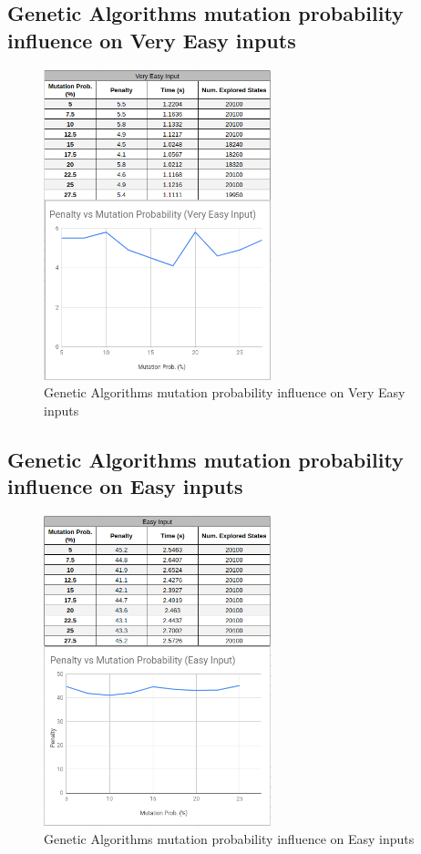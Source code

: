 \documentclass[conference]{IEEEtran}
\begin{document}
\subsection{Genetic Algorithms mutation probability influence on Very Easy inputs}

\begin{figure}[H]
    \centerline{\includegraphics[width=250px]{mutation_prob_very_easy.png}}
    \caption{Genetic Algorithms mutation probability influence on Very Easy inputs}
\end{figure}

\subsection{Genetic Algorithms mutation probability influence on Easy inputs}

\begin{figure}[H]
    \centerline{\includegraphics[width=250px]{mutation_prob_easy.png}}
    \caption{Genetic Algorithms mutation probability influence on Easy inputs}
\end{figure}
\end{document}
